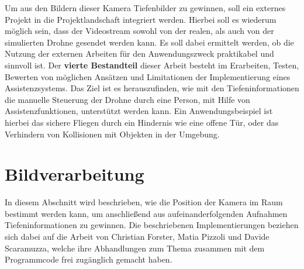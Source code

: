 Um aus den Bildern dieser Kamera Tiefenbilder zu gewinnen, soll ein externes Projekt in die Projektlandschaft integriert werden. Hierbei soll es wiederum möglich sein, dass der Videostream sowohl von der realen, als auch von der simulierten Drohne gesendet werden kann. Es soll dabei ermittelt werden, ob die Nutzung der externen Arbeiten für den Anwendungszweck praktikabel und sinnvoll ist. \newline
Der \textbf{vierte Bestandteil} dieser Arbeit besteht im Erarbeiten, Testen, Bewerten von möglichen Ansätzen und Limitationen der Implementierung eines Assistenzsystems. Das Ziel ist es herauszufinden, wie mit den Tiefeninformationen die manuelle Steuerung der Drohne durch eine Person, mit Hilfe von Assistenzfunktionen, unterstützt werden kann. \newline
Ein Anwendungsbeispiel ist hierbei das sichere Fliegen durch ein Hindernis wie eine offene Tür, oder das Verhindern von Kollisionen mit Objekten in der Umgebung.
\newpage
\section{Bildverarbeitung}
\label{Bildverarbeitung}
In diesem Abschnitt wird beschrieben, wie die Position der Kamera im Raum bestimmt werden kann, um anschließend aus aufeinanderfolgenden Aufnahmen Tiefeninformationen zu gewinnen. Die beschriebenen Implementierungen beziehen sich dabei auf die Arbeit von Christian Forster, Matia Pizzoli und Davide Scaramuzza, welche ihre Abhandlungen zum Thema zusammen mit dem Programmcode frei zugänglich gemacht haben.

